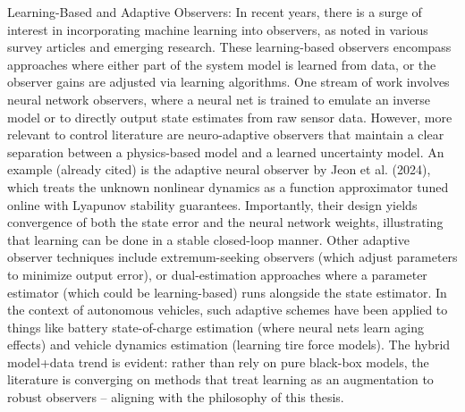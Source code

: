 Learning-Based and Adaptive Observers: In recent years, there is a surge of interest in incorporating machine learning into observers, as noted in various survey articles and emerging research. 
These learning-based observers encompass approaches where either part of the system model is learned from data, or the observer gains are adjusted via learning algorithms. 
One stream of work involves neural network observers, where a neural net is trained to emulate an inverse model or to directly output state estimates from raw sensor data. 
However, more relevant to control literature are neuro-adaptive observers that maintain a clear separation between a physics-based model and a learned uncertainty model.
An example (already cited) is the adaptive neural observer by Jeon et al. (2024), which treats the unknown nonlinear dynamics as a function approximator tuned online with Lyapunov stability guarantees. 
Importantly, their design yields convergence of both the state error and the neural network weights, illustrating that learning can be done in a stable closed-loop manner. Other adaptive observer techniques include extremum-seeking observers (which adjust parameters to minimize output error), or dual-estimation approaches where a parameter estimator (which could be learning-based) runs alongside the state estimator. In the context of autonomous vehicles, such adaptive schemes have been applied to things like battery state-of-charge estimation (where neural nets learn aging effects) and vehicle dynamics estimation (learning tire force models). The hybrid model+data trend is evident: rather than rely on pure black-box models, the literature is converging on methods that treat learning as an augmentation to robust observers – aligning with the philosophy of this thesis.

